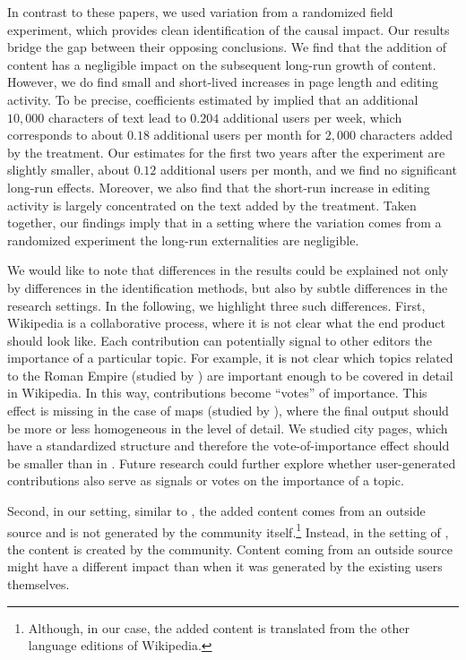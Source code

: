 \documentclass[12pt]{article}
\begin{document}
In contrast to these papers, we used variation from a randomized field experiment, which provides clean identification of the causal impact. Our results bridge the gap between their opposing conclusions. We find that the addition of content has a negligible impact on the subsequent long-run growth of content. However, we do find small and short-lived increases in page length and editing activity. To be precise, coefficients estimated by \cite{aaltonen-seiler-2016} implied that an additional $10,000$ characters of text lead to $0.204$ additional users per week, which corresponds to about $0.18$ additional users per month for $2,000$  characters added by the treatment. Our estimates for the first two years after the experiment are slightly smaller, about $0.12$ additional users per month, and we find no significant long-run effects. Moreover, we also find that the short-run increase in editing activity is largely concentrated on the text added by the treatment. Taken together, our findings imply that in a setting where the variation comes from a randomized experiment the long-run externalities are negligible. 

We would like to note that differences in the results could be explained not only by differences in the identification methods, but also by subtle differences in the research settings. In the following, we highlight three such differences.
First, Wikipedia is a collaborative process, where it is not clear what the end product should look like. Each contribution can potentially signal to other editors the importance of a particular topic. For example, it is not clear which topics related to the Roman Empire (studied by \cite{aaltonen-seiler-2016}) are important enough to be covered in detail in Wikipedia. In this way, contributions become ``votes'' of importance. This effect is missing in the case of maps (studied by \cite{nagaraj2017information}), where the final output should be more or less homogeneous in the level of detail. We studied city pages, which have a standardized structure and therefore the vote-of-importance effect should be smaller than in \cite{aaltonen-seiler-2016}. Future research could further explore whether user-generated contributions also serve as signals or votes on the importance of a topic.


Second, in our setting, similar to \cite{nagaraj2017information}, the added content comes from an outside source and is not generated by the community itself.\footnote{Although, in our case, the added content is translated from the other language editions of Wikipedia.} Instead, in the setting of \cite{aaltonen-seiler-2016}, the content is created by the community. Content coming from an outside source might have a different impact than when it was generated by the existing users themselves.  
\end{document}
